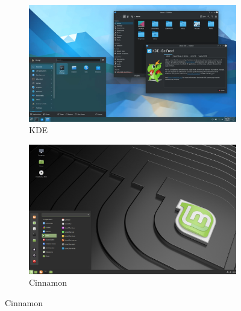 \documentclass[aspectratio=43]{beamer}
\begin{document}
\begin{frame}{\secname}{\subsecname}
\begin{figure}
\begin{subfigure}{.4\textwidth}
                \centering
                \includegraphics[width=\textwidth]{img/kde.png}
                \caption*{KDE}
            \end{subfigure}
            \begin{subfigure}{.4\textwidth}
                \centering
                \includegraphics[width=\textwidth]{img/cinnamon.png}
                \caption*{Cinnamon}
            \end{subfigure}
        \end{figure}
    \end{frame}

\end{document}
